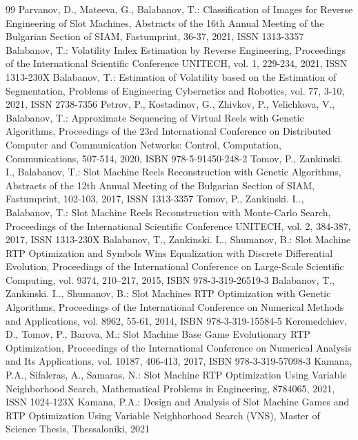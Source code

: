 \documentclass[12pt,twoside,openany]{book}
\begin{document}
\begin{thebibliography}{99}
\thispagestyle{empty}
 Parvanov, D., Mateeva, G., Balabanov, T.: Classification of Images for Reverse Engineering of Slot Machines, Abstracts of the 16th Annual Meeting of the Bulgarian Section of SIAM, Fastumprint, 36-37, 2021, ISSN 1313-3357
 Balabanov, T.: Volatility Index Estimation by Reverse Engineering, Proceedings of the International Scientific Conference UNITECH, vol. 1, 229-234, 2021, ISSN 1313-230X
 Balabanov, T.: Estimation of Volatility based on the Estimation of Segmentation, Problems of Engineering Cybernetics and Robotics, vol. 77, 3-10, 2021, ISSN 2738-7356
 Petrov, P., Kostadinov, G., Zhivkov, P., Velichkova, V., Balabanov, T.: Approximate Sequencing of Virtual Reels with Genetic Algorithms, Proceedings of the 23rd International Conference on Distributed Computer and Communication Networks: Control, Computation, Communications, 507-514, 2020, ISBN 978-5-91450-248-2
 Tomov, P., Zankinski. I., Balabanov, T.: Slot Machine Reels Reconstruction with Genetic Algorithms, Abstracts of the 12th Annual Meeting of the Bulgarian Section of SIAM, Fastumprint, 102-103, 2017, ISSN 1313-3357
 Tomov, P., Zankinski. I.., Balabanov, T.: Slot Machine Reels Reconstruction with Monte-Carlo Search, Proceedings of the International Scientific Conference UNITECH, vol. 2, 384-387, 2017, ISSN 1313-230X
 Balabanov, T., Zankinski. I.., Shumanov, B.: Slot Machine RTP Optimization and Symbols Wins Equalization with Discrete Differential Evolution, Proceedings of the International Conference on Large-Scale Scientific Computing, vol. 9374, 210–217, 2015, ISBN 978-3-319-26519-3
 Balabanov, T., Zankinski. I.., Shumanov, B.: Slot Machines RTP Optimization with Genetic Algorithms, Proceedings of the International Conference on Numerical Methods and Applications, vol. 8962, 55-61, 2014, ISBN 978-3-319-15584-5
 Keremedchiev, D., Tomov, P., Barova, M.: Slot Machine Base Game Evolutionary RTP Optimization, Proceedings of the International Conference on Numerical Analysis and Its Applications, vol. 10187, 406-413, 2017, ISBN 978-3-319-57098-3
 Kamana, P.A., Sifaleras, A., Samaras, N.: Slot Machine RTP Optimization Using Variable Neighborhood Search, Mathematical Problems in Engineering, 8784065, 2021, ISSN 1024-123X
 Kamana, P.A.: Design and Analysis of Slot Machine Games and RTP Optimization Using Variable Neighborhood Search (VNS), Master of Science Thesis, Thessaloniki, 2021
\end{thebibliography}
\end{document}
